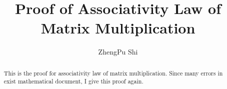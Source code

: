 \documentclass[preprint,12pt]{elsarticle}
\begin{document}
\begin{frontmatter}



  \title{Proof of Associativity Law of Matrix Multiplication}
  \author{ZhengPu Shi}


  \begin{abstract}
    This is the proof for associativity law of matrix multiplication.
    Since many errors in exist mathematical document, I give this proof again.
  \end{abstract}




\end{frontmatter}
\end{document}
